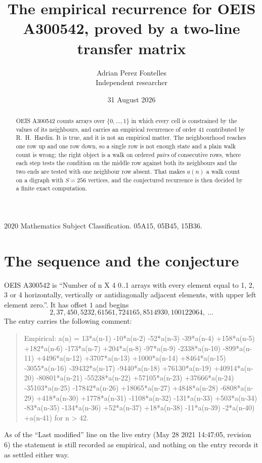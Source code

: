 \documentclass[11pt,a4paper]{article}
\title{The empirical recurrence for OEIS A300542, proved by a two-line transfer matrix}
\author{Adrian Perez Fontelles\\ \small Independent researcher}
\date{31 August 2026}
\theoremstyle{plain}
\theoremstyle{definition}
\begin{document}
\maketitle

\begin{abstract}
OEIS A300542 counts arrays over $\{0,\dots,1\}$ in which every cell is constrained by the
values of its neighbours, and carries an empirical recurrence of order $41$ contributed
by R.~H.~Hardin. It is true, and it is not an empirical matter. The neighbourhood reaches one
row up and one row down, so a single row is not enough state and a plain walk count
is wrong; the right object is a walk on ordered \emph{pairs} of consecutive rows, where
each step tests the condition on the middle row against both its neighbours and the two
ends are tested with one neighbour row absent. That makes $a(n)$ a walk count on a digraph
with $S=256$ vertices, and the conjectured recurrence is then decided by a finite exact
computation.
\end{abstract}

\noindent\small 2020 Mathematics Subject Classification. 05A15, 05B45, 15B36.\normalsize

\section{The sequence and the conjecture}

OEIS A300542 is ``Number of n X 4 0..1 arrays with every element equal to 1, 2, 3 or 4 horizontally, vertically or antidiagonally adjacent elements, with upper left element zero.''. It has offset $1$ and begins
\[
2, 37, 450, 5232, 61561, 724165, 8514930, 100122064,\ \dots
\]
The entry carries the following comment:
\begin{quote}\small
Empirical: a(n) = 13*a(n-1) -10*a(n-2) -52*a(n-3) -39*a(n-4) +158*a(n-5) +182*a(n-6) -173*a(n-7) +204*a(n-8) -97*a(n-9) -2338*a(n-10) -899*a(n-11) +4496*a(n-12) +3707*a(n-13) +1000*a(n-14) +8464*a(n-15) -3055*a(n-16) -39432*a(n-17) -9440*a(n-18) +76130*a(n-19) +40914*a(n-20) -80801*a(n-21) -55238*a(n-22) +57105*a(n-23) +37666*a(n-24) -35103*a(n-25) -17842*a(n-26) +18065*a(n-27) +4848*a(n-28) -6808*a(n-29) +418*a(n-30) +1778*a(n-31) -1108*a(n-32) -131*a(n-33) +503*a(n-34) -83*a(n-35) -134*a(n-36) +52*a(n-37) +18*a(n-38) -11*a(n-39) -2*a(n-40) +a(n-41) for n > 42.
\end{quote}
As of the ``Last modified'' line on the live entry (May 28 2021 14:47:05, revision 6) the statement is
still recorded as empirical, and nothing on the entry records it as settled either way.
\end{document}
